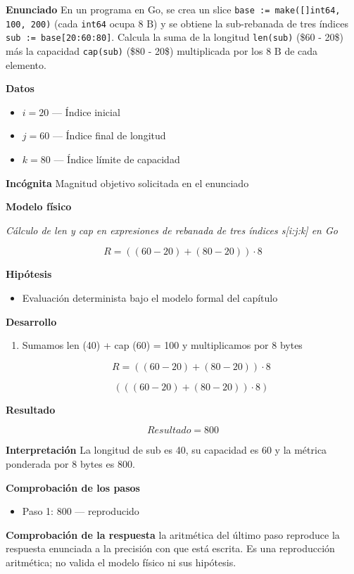 \documentclass{book}
\begin{document}
\begin{tcolorbox}[title={Problema resuelto}, studiumworked, breakable]

\noindent\textbf{Enunciado}
En un programa en Go, se crea un slice \texttt{base := make([]int64, 100, 200)} (cada \texttt{int64} ocupa \(8\text{ B}\)) y se obtiene la sub-rebanada de tres índices \texttt{sub := base[20:60:80]}. Calcula la suma de la longitud \texttt{len(sub)} (\$60 - 20\$) más la capacidad \texttt{cap(sub)} (\$80 - 20\$) multiplicada por los \(8\text{ B}\) de cada elemento.

\noindent\textbf{Datos}
\begin{itemize}
\item $i = 20$ — Índice inicial
\item $j = 60$ — Índice final de longitud
\item $k = 80$ — Índice límite de capacidad
\end{itemize}

\noindent\textbf{Incógnita}
Magnitud objetivo solicitada en el enunciado

\noindent\textbf{Modelo físico}

\noindent\textit{Cálculo de len y cap en expresiones de rebanada de tres índices s[i:j:k] en Go}

\[
R = ((60 - 20) + (80 - 20)) \cdot 8
\]

\noindent\textbf{Hipótesis}
\begin{itemize}
\item Evaluación determinista bajo el modelo formal del capítulo
\end{itemize}

\noindent\textbf{Desarrollo}
\begin{enumerate}
\item
Sumamos len (40) + cap (60) = 100 y multiplicamos por 8 bytes

\[
R = ((60 - 20) + (80 - 20)) \cdot 8
\]

\[
\left(\left(\left(60-20\right)+\left(80-20\right)\right)\cdot 8\right)
\]
\end{enumerate}

\noindent\textbf{Resultado}

\[
Resultado = 800
\]

\noindent\textbf{Interpretación}
La longitud de sub es 40, su capacidad es 60 y la métrica ponderada por 8 bytes es 800.

\noindent\textbf{Comprobación de los pasos}
\begin{itemize}
\item Paso 1: $800$ — reproducido
\end{itemize}

\noindent\textbf{Comprobación de la respuesta} la aritmética del último paso reproduce la respuesta enunciada a la precisión con que está escrita. Es una reproducción aritmética; no valida el modelo físico ni sus hipótesis.
\end{tcolorbox}
\end{document}
